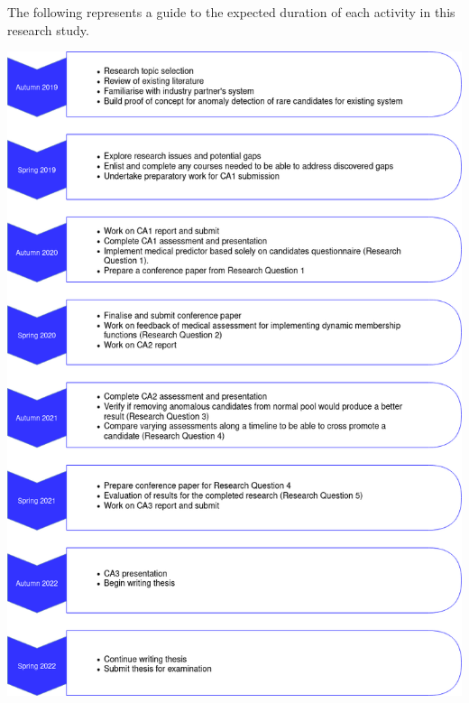 The following represents a guide to the expected duration of each activity in this research study.

\includegraphics[scale=0.5]{fig/ResearchTimeline.png}
